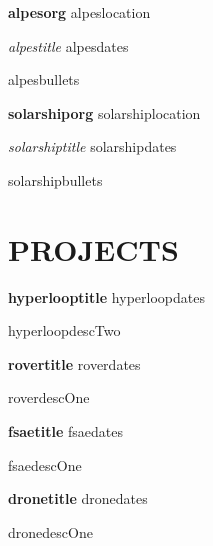 \documentclass[10pt,a4paper]{article}
\newcommand{\projectOne}{hyperloop}
\newcommand{\projectTwo}{rover}
\newcommand{\projectThree}{fsae}
\newcommand{\projectFour}{drone}
\newcommand{\jobTwo}{alpes}
\newcommand{\jobFour}{solarship}
\newcommand{\get}[2]{\csname #1#2\endcsname}
\begin{document}
\vspace{2pt}

\textbf{\get{\jobTwo}{org}} \hfill \get{\jobTwo}{location}

\textit{\get{\jobTwo}{title}} \hfill \get{\jobTwo}{dates}

\begin{itemize}
    \get{\jobTwo}{bullets}
\end{itemize}

\vspace{2pt}





\textbf{\get{\jobFour}{org}} \hfill \get{\jobFour}{location}

\textit{\get{\jobFour}{title}} \hfill \get{\jobFour}{dates}

\begin{itemize}
    \get{\jobFour}{bullets}
\end{itemize}

\vspace{2pt}



\hrulefill 
\section*{PROJECTS}

\textbf{\get{\projectOne}{title}} \hfill \get{\projectOne}{dates}

\get{\projectOne}{descTwo}

\vspace{4pt}

\textbf{\get{\projectTwo}{title}} \hfill \get{\projectTwo}{dates}

\get{\projectTwo}{descOne}

\vspace{4pt}

\textbf{\get{\projectThree}{title}} \hfill \get{\projectThree}{dates}

\get{\projectThree}{descOne}

\vspace{4pt}

\textbf{\get{\projectFour}{title}} \hfill \get{\projectFour}{dates}

\get{\projectFour}{descOne}

\vspace{2pt}

\hrulefill 


\skills

%
\end{document}
